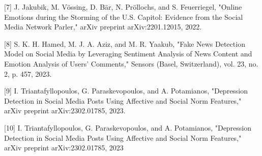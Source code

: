 \documentclass[conference]{IEEEtran}
\begin{document}
[7] J. Jakubik, M. Vössing, D. Bär, N. Pröllochs, and S. Feuerriegel, "Online Emotions during the Storming of the U.S. Capitol: Evidence from the Social Media Network Parler," arXiv preprint arXiv:2201.12015, 2022.

[8] S. K. H. Hamed, M. J. A. Aziz, and M. R. Yaakub, "Fake News Detection Model on Social Media by Leveraging Sentiment Analysis of News Content and Emotion Analysis of Users' Comments," Sensors (Basel, Switzerland), vol. 23, no. 2, p. 457, 2023.

[9] I. Triantafyllopoulos, G. Paraskevopoulos, and A. Potamianos, "Depression Detection in Social Media Posts Using Affective and Social Norm Features," arXiv preprint arXiv:2302.01785, 2023.

[10] I. Triantafyllopoulos, G. Paraskevopoulos, and A. Potamianos, "Depression Detection in Social Media Posts Using Affective and Social Norm Features," arXiv preprint arXiv:2302.01785, 2023
\end{document}
